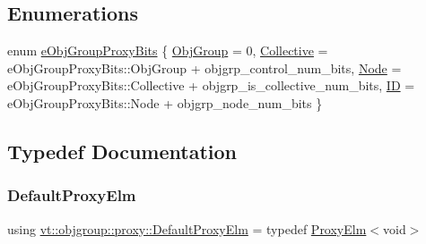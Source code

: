 \subsection*{Enumerations}
\begin{DoxyCompactItemize}
\item 
enum \hyperlink{namespacevt_1_1objgroup_1_1proxy_a5cfde1a666e49070fcc0312e51d53777}{e\+Obj\+Group\+Proxy\+Bits} \{ \hyperlink{namespacevt_1_1objgroup_1_1proxy_a5cfde1a666e49070fcc0312e51d53777a235be9f56eb1337ea20d2937ffb7a8a4}{Obj\+Group} = 0, 
\hyperlink{namespacevt_1_1objgroup_1_1proxy_a5cfde1a666e49070fcc0312e51d53777ab1d0e2d0ac577126529814c35a32c003}{Collective} = e\+Obj\+Group\+Proxy\+Bits\+:\+:Obj\+Group + objgrp\+\_\+control\+\_\+num\+\_\+bits, 
\hyperlink{namespacevt_1_1objgroup_1_1proxy_a5cfde1a666e49070fcc0312e51d53777a179829552544d5bb4b3bac56d953e06a}{Node} = e\+Obj\+Group\+Proxy\+Bits\+:\+:Collective + objgrp\+\_\+is\+\_\+collective\+\_\+num\+\_\+bits, 
\hyperlink{namespacevt_1_1objgroup_1_1proxy_a5cfde1a666e49070fcc0312e51d53777a6de04ce539708519a851efd1640f2b48}{ID} = e\+Obj\+Group\+Proxy\+Bits\+:\+:Node + objgrp\+\_\+node\+\_\+num\+\_\+bits
 \}
\end{DoxyCompactItemize}


\subsection{Typedef Documentation}
\mbox{\label{namespacevt_1_1objgroup_1_1proxy_ae207233400f23aa10c30217cdb369c54}} 
\subsubsection{\texorpdfstring{Default\+Proxy\+Elm}{DefaultProxyElm}}
{\footnotesize\ttfamily using \hyperlink{namespacevt_1_1objgroup_1_1proxy_ae207233400f23aa10c30217cdb369c54}{vt\+::objgroup\+::proxy\+::\+Default\+Proxy\+Elm} = typedef \hyperlink{structvt_1_1objgroup_1_1proxy_1_1_proxy_elm}{Proxy\+Elm}$<$void$>$}

\mbox{\label{namespacevt_1_1objgroup_1_1proxy_ac7e0a0acb3b31d5469a603de08192adc}} 
